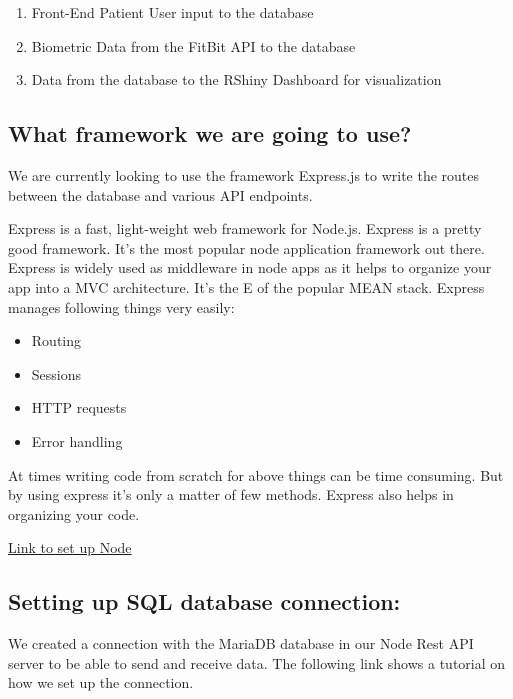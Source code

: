 \documentclass[]{book}
\providecommand{\tightlist}{%
  \setlength{\itemsep}{0pt}\setlength{\parskip}{0pt}}
\begin{document}
\begin{enumerate}
\def\labelenumi{\arabic{enumi}.}
\tightlist
\item
  Front-End Patient User input to the database
\item
  Biometric Data from the FitBit API to the database
\item
  Data from the database to the RShiny Dashboard for visualization
\end{enumerate}

\subsection{What framework we are going to
use?}\label{what-framework-we-are-going-to-use}

We are currently looking to use the framework Express.js to write the
routes between the database and various API endpoints.

Express is a fast, light-weight web framework for Node.js. Express is a
pretty good framework. It's the most popular node application framework
out there. Express is widely used as middleware in node apps as it helps
to organize your app into a MVC architecture. It's the E of the popular
MEAN stack. Express manages following things very easily:

\begin{itemize}
\tightlist
\item
  Routing
\item
  Sessions
\item
  HTTP requests
\item
  Error handling
\end{itemize}

At times writing code from scratch for above things can be time
consuming. But by using express it's only a matter of few methods.
Express also helps in organizing your code.

\href{https://medium.com/@onejohi/building-a-simple-rest-api-with-nodejs-and-express-da6273ed7ca9}{Link
to set up Node}

\subsection{Setting up SQL database
connection:}\label{setting-up-sql-database-connection}

We created a connection with the MariaDB database in our Node Rest API
server to be able to send and receive data. The following link shows a
tutorial on how we set up the connection.
\end{document}

